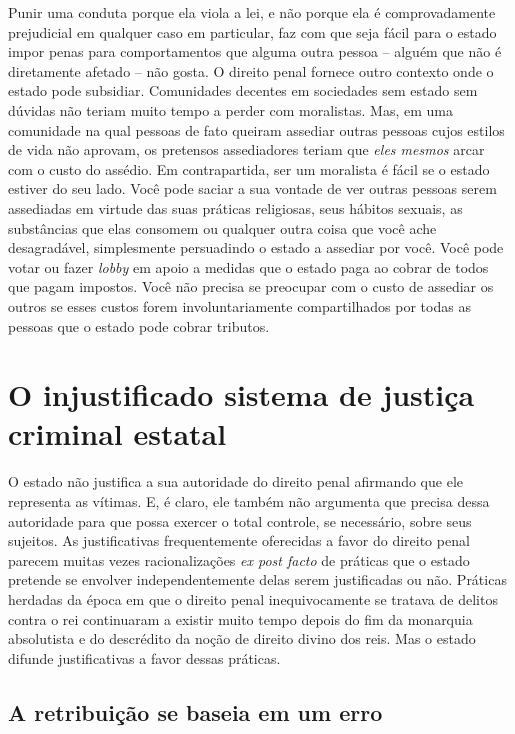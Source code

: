 Punir uma conduta porque ela viola a lei, e não porque ela é comprovadamente prejudicial em qualquer caso em particular, faz com que seja fácil para o estado impor penas para comportamentos que alguma outra pessoa -- alguém que não é diretamente afetado -- não gosta. O direito penal fornece outro contexto onde o estado pode subsidiar. Comunidades decentes em sociedades sem estado sem dúvidas não teriam muito tempo a perder com moralistas. Mas, em uma comunidade na qual pessoas de fato queiram assediar outras pessoas cujos estilos de vida não aprovam, os pretensos assediadores teriam que \emph{eles mesmos} arcar com o custo do assédio. Em contrapartida, ser um moralista é fácil se o estado estiver do seu lado. Você pode saciar a sua vontade de ver outras pessoas serem assediadas em virtude das suas práticas religiosas, seus hábitos sexuais, as substâncias que elas consomem ou qualquer outra coisa que você ache desagradável, simplesmente persuadindo o estado a assediar por você. Você pode votar ou fazer \emph{lobby} em apoio a medidas que o estado paga ao cobrar de todos que pagam impostos. Você não precisa se preocupar com o custo de assediar os outros se esses custos forem involuntariamente compartilhados por todas as pessoas que o estado pode cobrar tributos.

\section{O injustificado sistema de justiça criminal estatal}

O estado não justifica a sua autoridade do direito penal afirmando que ele representa as vítimas. E, é claro, ele também não argumenta que precisa dessa autoridade para que possa exercer o total controle, se necessário, sobre seus sujeitos. As justificativas frequentemente oferecidas a favor do direito penal parecem muitas vezes racionalizações \emph{ex post facto} de práticas que o estado pretende se envolver independentemente delas serem justificadas ou não. Práticas herdadas da época em que o direito penal inequivocamente se tratava de delitos contra o rei continuaram a existir muito tempo depois do fim da monarquia absolutista e do descrédito da noção de direito divino dos reis. Mas o estado difunde justificativas a favor dessas práticas.

\subsection*{A retribuição se baseia em um erro}

